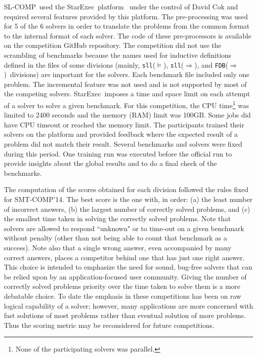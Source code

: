 \documentclass[twoside,11pt]{article}
\newcommand{\limp}{\Rightarrow}
\newcommand{\sllsat}{\texttt{sll}($\models$)}
\newcommand{\sllent}{\texttt{sll}($\limp$)}
\newcommand{\FDBent}{\texttt{FDB}($\limp$)}
\newcommand{\smtcomp}{\textsf{SMT-COMP}}
\newcommand{\slcomp}{\textsf{SL-COMP}}
\newcommand{\starexec}{\textsf{StarExec}}
\begin{document}
\slcomp\ used the \starexec\ platform~\cite{StarExecsite} under the control of David Cok 
and required several features provided by this platform.
%
The pre-processing was used for 5 of the 6 solvers in order to translate the problems from the common format to the internal format of each solver. The code of these pre-processors is available on the competition GitHub repository.
%
The competition did not use the scrambling of benchmarks because the names used for inductive definitions defined in the files of some divisions (mainly, \sllsat, \sllent, and \FDBent\ divisions) are important for the solvers.
%
Each benchmark file included only one problem. 
The incremental feature was not used and is not supported by most of the competing solvers.
%
\starexec\ imposes a time and space limit on each attempt of a solver to solve a given benchmark. For this competition, the CPU time\footnote{None of the participating solvers was parallel.} was limited to 2400 seconds and
the memory (RAM) limit was 100GB. 
Some jobs did have CPU timeout or reached the memory limit.
%
The participants trained their solvers on the platform and provided feedback where the expected result of a problem did not match their result. Several benchmarks and solvers were fixed during this period.
One training run was executed before the official run to provide insights about the global results and to do a final check of the benchmarks.

The computation of the scores obtained for each division followed the rules fixed for \smtcomp'14.
The best score is the one with, in order:
(a) the least number of incorrect answers, 
(b) the largest number of correctly solved problems, and 
(c) the smallest time taken in solving the correctly solved problems.
%
Note that solvers are allowed to respond ``unknown" or to time-out on a given benchmark without penalty (other than not being able to count that benchmark as a success).
Note also that a single wrong answer, even accompanied by many correct answers, places a competitor behind one that has just one right answer. This choice is intended to emphasize the need for sound, bug-free solvers that can be relied upon by an application-focused user community. 
%
Giving the number of correctly
solved problems priority over the time taken to solve them is a more debatable choice. To date the emphasis in these competitions has been on raw logical capability of a solver; however, many applications are more concerned with fast solutions of most problems rather than eventual solution of more problems. Thus the scoring metric may be reconsidered for future competitions.
\end{document}
